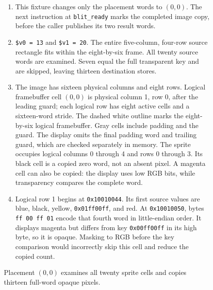 \begin{figure}[htbp]
  \par\smallskip
  \begin{minipage}{\linewidth}
    \small
    \begin{enumerate}
      \setlength{\itemsep}{2pt}
            \setlength{\parsep}{0pt}
      \item This fixture changes only the placement words to $(0,0)$. The next instruction at \texttt{blit\_ready} marks the completed image copy, before the caller publishes its two result words.
      \item \texttt{\$v0 = 13} and \texttt{\$v1 = 20}. The entire five-column, four-row source rectangle fits within the eight-by-six frame. All twenty source words are examined. Seven equal the full transparent key and are skipped, leaving thirteen destination stores.
      \item The image has sixteen physical columns and eight rows. Logical framebuffer cell $(0,0)$ is physical column 1, row 0, after the leading guard; each logical row has eight active cells and a sixteen-word stride. The dashed white outline marks the eight-by-six logical framebuffer. Gray cells include padding and the guard. The display omits the final padding word and trailing guard, which are checked separately in memory. The sprite occupies logical columns 0 through 4 and rows 0 through 3. Its black cell is a copied zero word, not an absent pixel. A magenta cell can also be copied: the display uses low RGB bits, while transparency compares the complete word.
      \item Logical row 1 begins at \texttt{0x10010044}. Its first source values are blue, black, yellow, \texttt{0x01ff00ff}, and red. At \texttt{0x10010050}, bytes \texttt{ff 00 ff 01} encode that fourth word in little-endian order. It displays magenta but differs from key \texttt{0x00ff00ff} in its high byte, so it is opaque. Masking to RGB before the key comparison would incorrectly skip this cell and reduce the copied count.
    \end{enumerate}
  \end{minipage}
  \caption{Placement $(0,0)$ examines all twenty sprite cells and copies thirteen full-word opaque pixels.}
  \label{capture:016-clipped-sprite-blitter-f02}
  \label{blit-f02}
\end{figure}
\par
